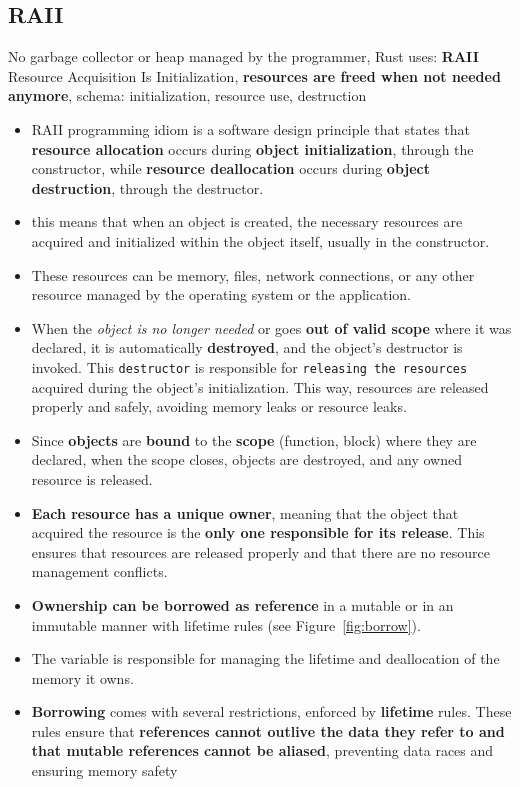 \documentclass{article}
\begin{document}
\begin{itemize}
\subsection{RAII}    
No garbage collector or heap managed by the programmer, Rust uses: \textbf{RAII} Resource Acquisition Is Initialization, \textbf{resources are freed when not needed anymore}, schema: initialization, resource use, destruction
    \begin{itemize}
        \item RAII programming idiom is a software design principle that states that \textbf{resource allocation} occurs during \textbf{object initialization}, through the constructor, while \textbf{resource deallocation} occurs during \textbf{object destruction}, through the destructor.
        \item this means that when an object is created, the necessary resources are acquired and initialized within the object itself, usually in the constructor.
        \item These resources can be memory, files, network connections, or any other resource managed by the operating system or the application.
        \item When the \textit{object is no longer needed} or goes \textbf{out of valid scope} where it was declared, it is automatically \textbf{destroyed}, and the object's destructor is invoked. This \texttt{destructor} is responsible for \texttt{releasing the resources} acquired during the object's initialization. This way, resources are released properly and safely, avoiding memory leaks or resource leaks.
        \item Since \textbf{objects} are \textbf{bound} to the \textbf{scope} (function, block) where they are declared, when the scope closes, objects are destroyed, and any owned resource is released.
        \item \textbf{Each resource has a unique owner}, meaning that the object that acquired the resource is the \textbf{only one responsible for its release}. This ensures that resources are released properly and that there are no resource management conflicts.
        \item \textbf{Ownership can be borrowed as reference} in a mutable or in an immutable manner with lifetime rules (see Figure~\ref{fig:borrow}).
        \item The variable is responsible for managing the lifetime and deallocation of the memory it owns.
        \item \textbf{Borrowing} comes with several restrictions, enforced by \textbf{lifetime} rules. These rules ensure that \textbf{references cannot outlive the data they refer to and that mutable references cannot be aliased}, preventing data races and ensuring memory safety

\end{itemize}
\end{itemize}
\end{document}
